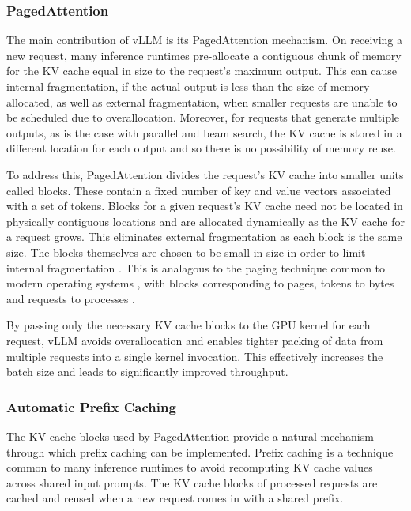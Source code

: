 \documentclass[12pt,twoside]{report}
\begin{document}
\subsubsection{PagedAttention}
The main contribution of vLLM is its PagedAttention mechanism. 
On receiving a new request, many inference runtimes pre-allocate a contiguous chunk of memory for the KV cache equal in size to the request's maximum output.
This can cause internal fragmentation, if the actual output is less than the size of memory allocated, as well as external fragmentation, when smaller requests are unable to be scheduled due to overallocation.
Moreover, for requests that generate multiple outputs, as is the case with parallel and beam search, the KV cache is stored in a different location for each output and so there is no possibility of memory reuse.

To address this, PagedAttention divides the request's KV cache into smaller units called blocks. 
These contain a fixed number of key and value vectors associated with a set of tokens. 
Blocks for a given request's KV cache need not be located in physically contiguous locations and are allocated dynamically as the KV cache for a request grows. 
This eliminates external fragmentation as each block is the same size.
The blocks themselves are chosen to be small in size in order to limit internal fragmentation \cite{kwon2023efficient}.
This is analagous to the paging technique common to modern operating systems \cite{kilburn1962one}, with blocks corresponding to pages, tokens to bytes and requests to processes \cite{kwon2023efficient}.

By passing only the necessary KV cache blocks to the GPU kernel for each request, vLLM avoids overallocation and enables tighter packing of data from multiple requests into a single kernel invocation. 
This effectively increases the batch size and leads to significantly improved throughput.

\subsubsection{Automatic Prefix Caching}\label{subsubsection:automatic_prefix_caching}
The KV cache blocks used by PagedAttention provide a natural mechanism through which prefix caching can be implemented.
Prefix caching is a technique common to many inference runtimes to avoid recomputing KV cache values across shared input prompts.
The KV cache blocks of processed requests are cached and reused when a new request comes in with a shared prefix.
\end{document}
